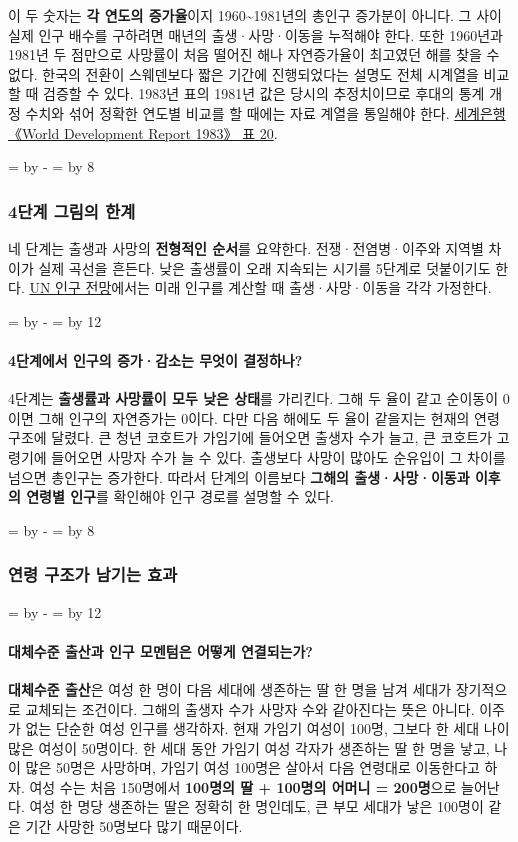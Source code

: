 \documentclass[10pt,a4paper]{article}
\newcommand{\ReserveQuestionSpace}{%
  \par\begingroup
  \dimen0=\pagegoal \advance\dimen0 by -\pagetotal
  \dimen2=\baselineskip \multiply\dimen2 by 12
  \ifdim\dimen0<\dimen2 \newpage\fi
  \endgroup}
\newcommand{\ReserveReadingSectionSpace}{%
  \par\begingroup
  \dimen0=\pagegoal \advance\dimen0 by -\pagetotal
  \dimen2=\baselineskip \multiply\dimen2 by 8
  \ifdim\dimen0<\dimen2 \newpage\fi
  \endgroup}
\begin{document}
이 두 숫자는 \textbf{각 연도의 증가율}이지 1960\textasciitilde{}1981년의 총인구 증가분이 아니다. 그 사이 실제 인구 배수를 구하려면 매년의 출생·사망·이동을 누적해야 한다. 또한 1960년과 1981년 두 점만으로 사망률이 처음 떨어진 해나 자연증가율이 최고였던 해를 찾을 수 없다. 한국의 전환이 스웨덴보다 짧은 기간에 진행되었다는 설명도 전체 시계열을 비교할 때 검증할 수 있다. 1983년 표의 1981년 값은 당시의 추정치이므로 후대의 통계 개정 수치와 섞어 정확한 연도별 비교를 할 때에는 자료 계열을 통일해야 한다. \href{https://documents1.worldbank.org/curated/en/997591468322730301/pdf/111190REPLACEMENT0WDR01983.pdf}{세계은행 《World Development Report 1983》 표 20}.\par

\ReserveReadingSectionSpace
\subsubsection*{4단계 그림의 한계}

네 단계는 출생과 사망의 \textbf{전형적인 순서}를 요약한다. 전쟁·전염병·이주와 지역별 차이가 실제 곡선을 흔든다. 낮은 출생률이 오래 지속되는 시기를 5단계로 덧붙이기도 한다. \href{https://population.un.org/wpp/}{UN 인구 전망}에서는 미래 인구를 계산할 때 출생·사망·이동을 각각 가정한다.\par

\ReserveQuestionSpace
\paragraph{4단계에서 인구의 증가·감소는 무엇이 결정하나?}
4단계는 \textbf{출생률과 사망률이 모두 낮은 상태}를 가리킨다. 그해 두 율이 같고 순이동이 0이면 그해 인구의 자연증가는 0이다. 다만 다음 해에도 두 율이 같을지는 현재의 연령 구조에 달렸다. 큰 청년 코호트가 가임기에 들어오면 출생자 수가 늘고, 큰 코호트가 고령기에 들어오면 사망자 수가 늘 수 있다. 출생보다 사망이 많아도 순유입이 그 차이를 넘으면 총인구는 증가한다. 따라서 단계의 이름보다 \textbf{그해의 출생·사망·이동과 이후의 연령별 인구}를 확인해야 인구 경로를 설명할 수 있다.\par

\ReserveReadingSectionSpace
\subsubsection*{연령 구조가 남기는 효과}

\ReserveQuestionSpace
\paragraph{대체수준 출산과 인구 모멘텀은 어떻게 연결되는가?}
\textbf{대체수준 출산}은 여성 한 명이 다음 세대에 생존하는 딸 한 명을 남겨 세대가 장기적으로 교체되는 조건이다. 그해의 출생자 수가 사망자 수와 같아진다는 뜻은 아니다. 이주가 없는 단순한 여성 인구를 생각하자. 현재 가임기 여성이 100명, 그보다 한 세대 나이 많은 여성이 50명이다. 한 세대 동안 가임기 여성 각자가 생존하는 딸 한 명을 낳고, 나이 많은 50명은 사망하며, 가임기 여성 100명은 살아서 다음 연령대로 이동한다고 하자. 여성 수는 처음 150명에서 \textbf{100명의 딸 + 100명의 어머니 = 200명}으로 늘어난다. 여성 한 명당 생존하는 딸은 정확히 한 명인데도, 큰 부모 세대가 낳은 100명이 같은 기간 사망한 50명보다 많기 때문이다.\par
\end{document}
